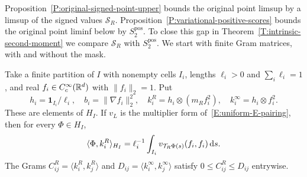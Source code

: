 Proposition~\ref{P:original-signed-point-upper} bounds the original point
limsup by a limsup of the signed values $\mathcal{S}_R$.
Proposition~\ref{P:variational-positive-scores} bounds the original point
liminf below by $S_2^{\mathrm{pos}}$. To close this gap in
Theorem~\ref{T:intrinsic-second-moment} we compare $\mathcal{S}_R$ with
$S_2^{\mathrm{pos}}$. We start with finite Gram matrices, with and without the
mask.

\begin{lemma}
  \label{L:positive-physical-gram}
  Take a finite partition of $I$ with nonempty cells $I_i$, lengths $\ell_i > 0$
  and $\sum_i\ell_i = 1$, and real $f_i \in C_c^\infty(\mathbb{R}^d)$ with $\|f_i\|_2 =
  1$. Put
  \[
    h_i=\mathbf1_{I_i}/\ell_i,\quad b_i=\|\nabla f_i\|_2^2,\quad
    k_i^R=h_i\otimes(m_Rf_i^2),\quad
    k_i^\infty=h_i\otimes f_i^2 .
  \]
  These are elements of $H_I$. If $v_L$ is the multiplier form
  of~\eqref{E:uniform-E-pairing}, then for every $\Phi \in H_I$,
  \begin{equation}\label{E:positive-label-row}
    \langle\Phi,k_i^R\rangle_{H_I}
    =\ell_i^{-1}\int_{I_i}v_{\mathcal{T}_R\Phi(s)}(f_i,f_i)\,\mathrm{d} s .
  \end{equation}
  The Grams $C^R_{ij} = \langle k_i^R,k_j^R\rangle$ and $D_{ij} = \langle
  k_i^\infty,k_j^\infty\rangle$ satisfy $0 \le C^R_{ij} \le D_{ij}$ entrywise.
\end{lemma}

